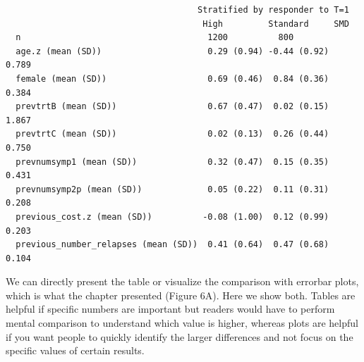 \documentclass[
  letterpaper,
  DIV=11,
  numbers=noendperiod]{scrreprt}
\begin{document}
\begin{verbatim}
                                      Stratified by responder to T=1
                                       High         Standard     SMD   
  n                                     1200          800              
  age.z (mean (SD))                     0.29 (0.94) -0.44 (0.92)  0.789
  female (mean (SD))                    0.69 (0.46)  0.84 (0.36)  0.384
  prevtrtB (mean (SD))                  0.67 (0.47)  0.02 (0.15)  1.867
  prevtrtC (mean (SD))                  0.02 (0.13)  0.26 (0.44)  0.750
  prevnumsymp1 (mean (SD))              0.32 (0.47)  0.15 (0.35)  0.431
  prevnumsymp2p (mean (SD))             0.05 (0.22)  0.11 (0.31)  0.208
  previous_cost.z (mean (SD))          -0.08 (1.00)  0.12 (0.99)  0.203
  previous_number_relapses (mean (SD))  0.41 (0.64)  0.47 (0.68)  0.104
\end{verbatim}

We can directly present the table or visualize the comparison with
errorbar plots, which is what the chapter presented (Figure 6A). Here we
show both. Tables are helpful if specific numbers are important but
readers would have to perform mental comparison to understand which
value is higher, whereas plots are helpful if you want people to quickly
identify the larger differences and not focus on the specific values of
certain results.
\end{document}
